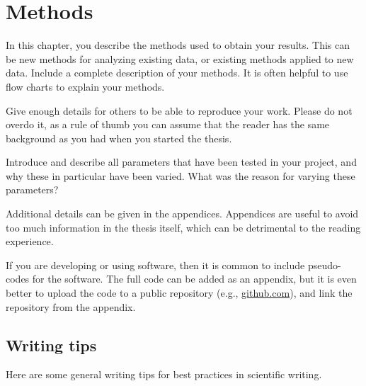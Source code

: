 \chapter{Methods}

In this chapter, you describe the methods used to obtain your results. This can be new methods for analyzing existing data, or existing methods applied to new data. Include a complete description of your methods. It is often helpful to use flow charts to explain your methods.

Give enough details for others to be able to reproduce your work. Please do not overdo it, as a rule of thumb you can assume that the reader has the same background as you had when you started the thesis.

Introduce and describe all parameters that have been tested in your project, and why these in particular have been varied. What was the reason for varying these parameters?

Additional details can be given in the appendices. Appendices are useful to avoid too much information in the thesis itself, which can be detrimental to the reading experience.

If you are developing or using software, then it is common to include pseudo-codes for the software. The full code can be added as an appendix, but it is even better to upload the code to a public repository (e.g., \url{github.com}), and link the repository from the appendix.

\section{Writing tips}

Here are some general writing tips for best practices in scientific writing.

